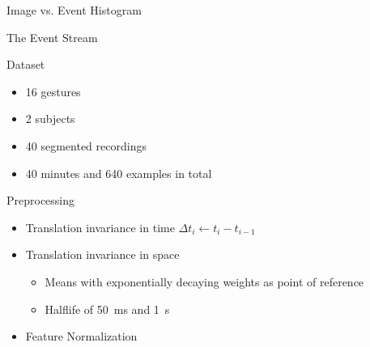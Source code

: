 \documentclass{beamer}
\begin{document}
\begin{frame}{Image vs. Event Histogram}
\begin{figure}
\begin{subfigure}{0.4\textwidth}
    \end{subfigure}
  \end{figure}
\end{frame}

\begin{frame}{The Event Stream}
\end{frame}

\begin{frame}{Dataset}
  \begin{itemize}
  \item 16 gestures
  \item 2 subjects
  \item 40 segmented recordings
  \item 40 minutes and 640 examples in total
  \end{itemize}
\end{frame}

\begin{frame}{Preprocessing}
  \begin{itemize}
  \item Translation invariance in time $\Delta t_{i} \leftarrow t_{i} - t_{i - 1}$
  \item Translation invariance in space
    \begin{itemize}
    \item Means with exponentially decaying weights as point of reference
    \item Halflife of \SI{50}{\milli\second} and \SI{1}{\second}
    \end{itemize}
  \item Feature Normalization
  \end{itemize}
\end{frame}
\end{document}
